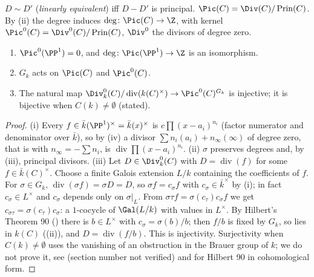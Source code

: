 \begin{definition}\label{def:curves:picard}
$D\sim D'$ (\emph{linearly equivalent}) iff $D-D'$ is principal. $\Pic(C)=\Div(C)/\operatorname{Prin}(C)$. By (ii) the degree
induces $\deg\colon\Pic(C)\to\Z$, with kernel $\Pic^0(C)=\Div^0(C)/\operatorname{Prin}(C)$, $\Div^0$ the divisors of degree zero.
\end{definition}

\begin{proposition}\label{prop:curves:picard}
\leavevmode
\begin{enumerate}[label=(\roman*)]
\item $\Pic^0(\PP^1)=0$, and $\deg\colon\Pic(\PP^1)\to\Z$ is an isomorphism.
\item $G_k$ acts on $\Pic(C)$ and $\Pic^0(C)$.
\item The natural map $\Div^0_k(C)/\operatorname{div}(k(C)^\times)\to\Pic^0(C)^{G_k}$ is injective; it is bijective when $C(k)\ne\emptyset$ (stated).
\end{enumerate}
\end{proposition}

\begin{proof}
(i) Every $f\in\bar k(\PP^1)^\times=\bar k(x)^\times$ is $c\prod(x-a_i)^{n_i}$ (factor numerator and denominator over $\bar k$), so by
(iv) a divisor $\sum n_i(a_i)+n_\infty(\infty)$ of degree zero, that is with $n_\infty=-\sum n_i$, is $\operatorname{div}\prod(x-a_i)^{n_i}$.
(ii) $\sigma$ preserves degrees and, by (iii), principal divisors.
(iii) Let $D\in\Div^0_k(C)$ with $D=\operatorname{div}(f)$ for some $f\in\bar k(C)^\times$. Choose a finite Galois extension $L/k$ containing the coefficients of
$f$. For $\sigma\in G_k$, $\operatorname{div}(\sigma f)=\sigma D=D$, so $\sigma f=c_\sigma f$ with $c_\sigma\in\bar k^\times$ by (i); in fact $c_\sigma\in L^\times$ and
$c_\sigma$ depends only on $\sigma|_L$. From $\sigma\tau f=\sigma(c_\tau)c_\sigma f$ we get $c_{\sigma\tau}=\sigma(c_\tau)c_\sigma$: a $1$-cocycle of $\Gal(L/k)$ with values in $L^\times$. By
Hilbert's Theorem 90 () there is $b\in L^\times$ with $c_\sigma=\sigma(b)/b$; then $f/b$ is fixed by $G_k$, so lies in $k(C)$
((ii)), and $D=\operatorname{div}(f/b)$. This is injectivity. Surjectivity when $C(k)\ne\emptyset$ uses the vanishing of an
obstruction in the Brauer group of $k$; we do not prove it, see \cite[Section 1]{MilneJacobian86} (section number not verified) and
 for Hilbert 90 in cohomological form.
\end{proof}

